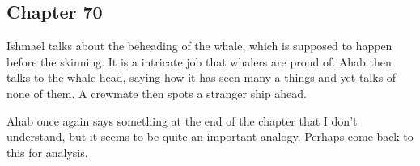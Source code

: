 \subsection{Chapter 70}

Ishmael talks about the beheading of the whale, which is supposed to happen
before the skinning. It is a intricate job that whalers are proud of. Ahab then
talks to the whale head, saying how it has seen many a things and yet talks of
none of them. A crewmate then spots a stranger ship ahead.

Ahab once again says something at the end of the chapter that I don't
understand, but it seems to be quite an important analogy. Perhaps come back to
this for analysis.
